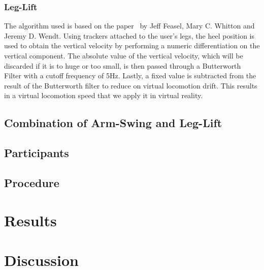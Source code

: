\documentclass[manuscript,review,anonymous]{acmart}
\begin{document}

\subsubsection{Leg-Lift}
The algorithm used is based on the paper~\cite{legLift2008} by Jeff Feasel, Mary C. Whitton and Jeremy D. Wendt. Using trackers attached to the user's legs, the heel position is used to obtain the vertical velocity by performing a numeric differentiation on the vertical component. The absolute value of the vertical velocity, which will be discarded if it is to huge or too small, is then passed through a Butterworth Filter with a cutoff frequency of 5Hz. Lastly, a fixed value is subtracted from the result of the Butterworth filter to reduce on virtual locomotion drift. This results in a virtual locomotion speed that we apply it in virtual reality.

\subsection{Combination of Arm-Swing and Leg-Lift}



\subsection{Participants}

\subsection{Procedure}


\section{Results}


\section{Discussion}
\end{document}
